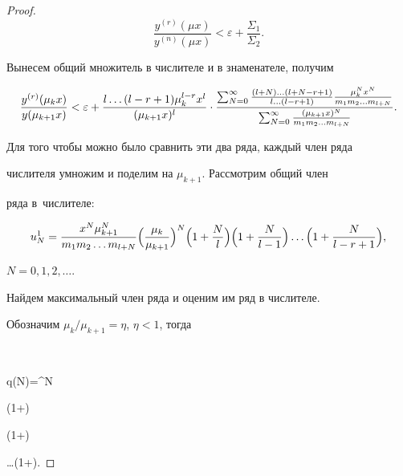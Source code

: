 \begin{proof}
$$

\frac{y^{(r)}(\mu x)}{y^{(n)}(\mu x)} < \varepsilon +

\frac{\Sigma_1}{\Sigma_2}.

$$



Вынесем общий множитель в числителе и в знаменателе, получим

$$

\frac{y^{(r)}(\mu_k x)}{y(\mu_{k+1} x)} < \varepsilon+\frac{l

\ldots (l-r+1)\mu_k^{l-r}x^l}{(\mu_{k+1}x)^{l}}\cdot

 \frac{%

\sum_{N=0}^\infty\frac{(l+N)\ldots(l+N-r+1)}{l\ldots(l-r+1)}\frac{\mu_k^N

x^N}{m_1 m_2 \ldots m_{l+N}}

}{\sum_{N=0}^\infty\frac{(\mu_{k+1}x)^{N}}{m_1 m_2 \ldots

m_{l+N}}}.

$$



Для того чтобы можно было сравнить эти два ряда, каждый член ряда

числителя умножим и поделим на $\mu_{k+1}$. Рассмотрим общий член

ряда в~числителе:

$$

u_N^1=\frac{x^{N}\mu_{k+1}^{N}}{m_1 m_2 \ldots

m_{l+N}}

\Bigl(\frac{\mu_{k}}{\mu_{k+1}}\Bigr)^N

\Bigl(1+\frac{N}{l}\Bigr)

\Bigl(1+\frac{N}{l-1}\Bigr)

\ldots 

\Bigl(1+\frac{N}{l-r+1}\Bigr),$$

$N=0, 1, 2, \ldots.$



Найдем максимальный член ряда и оценим им ряд в числителе.

Обозначим ${\mu_{k}}/{\mu_{k+1}} = \eta$, $\eta < 1$, тогда

$$

q(N)=\eta^N

\Bigl(1+\Bigr)

\Bigl(1+\Bigr)

\ldots \Bigl(1+\Bigr).


\end{proof}
